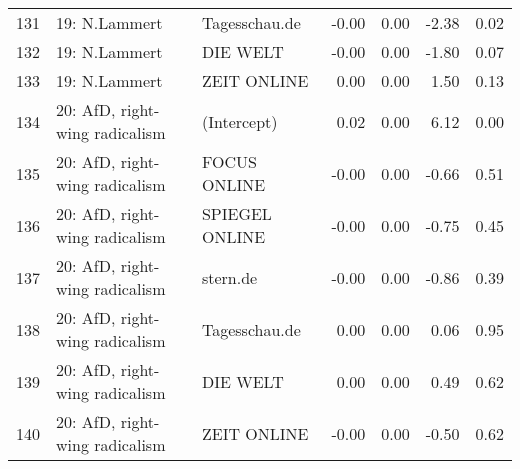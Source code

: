 \begin{table}[ht]
{\begin{tabular}{rllrrrr}
  131 & 19: N.Lammert & Tagesschau.de & -0.00 & 0.00 & -2.38 & 0.02 \\ 
  132 & 19: N.Lammert & DIE WELT & -0.00 & 0.00 & -1.80 & 0.07 \\ 
  133 & 19: N.Lammert & ZEIT ONLINE & 0.00 & 0.00 & 1.50 & 0.13 \\ 
  134 & 20: AfD, right-wing radicalism & (Intercept) & 0.02 & 0.00 & 6.12 & 0.00 \\ 
  135 & 20: AfD, right-wing radicalism & FOCUS ONLINE & -0.00 & 0.00 & -0.66 & 0.51 \\ 
  136 & 20: AfD, right-wing radicalism & SPIEGEL ONLINE & -0.00 & 0.00 & -0.75 & 0.45 \\ 
  137 & 20: AfD, right-wing radicalism & stern.de & -0.00 & 0.00 & -0.86 & 0.39 \\ 
  138 & 20: AfD, right-wing radicalism & Tagesschau.de & 0.00 & 0.00 & 0.06 & 0.95 \\ 
  139 & 20: AfD, right-wing radicalism & DIE WELT & 0.00 & 0.00 & 0.49 & 0.62 \\ 
  140 & 20: AfD, right-wing radicalism & ZEIT ONLINE & -0.00 & 0.00 & -0.50 & 0.62 \\ 
   \hline
\end{tabular}
}
\end{table}
